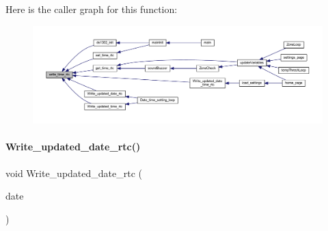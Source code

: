 Here is the caller graph for this function\+:
\nopagebreak
\begin{figure}[H]
\begin{center}
\leavevmode
\includegraphics[width=350pt]{a00014_aadecf4eb7d23c63d1216ced71440654e_icgraph}
\end{center}
\end{figure}
\mbox{\label{a00014_a7ae143903216d08d3f0c07b95e21c21b}} 
\paragraph{Write\+\_\+updated\+\_\+date\+\_\+rtc()}
{\footnotesize\ttfamily void Write\+\_\+updated\+\_\+date\+\_\+rtc (\begin{DoxyParamCaption}\item[{\textbf{ Date\+Time} $\ast$}]{date }\end{DoxyParamCaption})}

